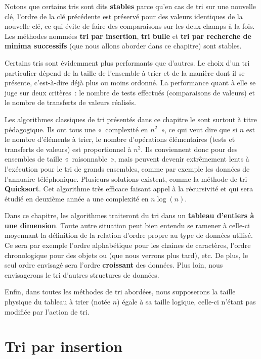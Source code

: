 	Notons que certains tris sont dits \textbf{stables} parce
	qu’en cas de tri sur une nouvelle clé, l’ordre de la
	clé précédente est préservé pour des valeurs identiques de la nouvelle
	clé, ce qui évite de faire des comparaisons sur les deux champs à la
	fois. Les méthodes nommées \textbf{tri par insertion}, \textbf{tri
	bulle} et \textbf{tri par recherche de minima successifs} (que nous
	allons aborder dans ce chapitre) sont stables.

	Certains tris sont évidemment plus performants que d’autres. Le choix
	d’un tri particulier dépend de la taille de l’ensemble à trier et de la
	manière dont il se présente, c’est-à-dire déjà plus ou moins ordonné.
	La performance quant à elle se juge sur deux critères~: le nombre de
	tests effectués (comparaisons de valeurs) et le nombre de transferts de
	valeurs réalisés. 
	
	Les algorithmes classiques de tri présentés dans ce chapitre le sont
	surtout à titre pédagogique. Ils ont tous une «~complexité en
	$n^2$~», ce qui veut dire que si $n$ est le nombre
	d’éléments à trier, le nombre d’opérations élémentaires (tests et
	transferts de valeurs) est proportionnel à $n^2$. Ils conviennent
	donc pour des ensembles de taille «~raisonnable~», mais peuvent devenir
	extrêmement lents à l’exécution pour le tri de grands ensembles, comme
	par exemple les données de l’annuaire téléphonique. Plusieurs solutions
	existent, comme la méthode de tri \textbf{Quicksort}. Cet algorithme
	très efficace faisant appel à la récursivité et qui sera étudié en
	deuxième année a une complexité en $n \log(n)$. 

	Dans ce chapitre, les algorithmes traiteront du tri dans un
	\textbf{tableau d’entiers à une dimension}. Toute autre
	situation peut bien entendu se ramener à celle-ci moyennant la
	définition de la relation d’ordre propre au type de données utilisé. Ce
	sera par exemple l’ordre alphabétique pour les chaines de caractères,
	l’ordre chronologique pour des objets  ou
	 (que nous verrons
	plus tard), etc. De plus, le seul ordre envisagé sera l’ordre
	\textbf{croissant} des données. Plus loin, nous envisagerons le tri 
	d’autres structures de données.

	Enfin, dans toutes les méthodes de tri abordées, nous supposerons la
	taille physique du tableau à trier (notée $n$) égale à sa taille
	logique, celle-ci n’étant pas modifiée par l’action de tri.

\clearpage
\section{Tri par insertion}

